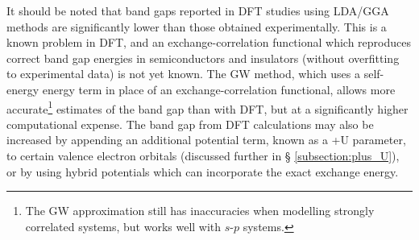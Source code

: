 It should be noted that band gaps reported in DFT studies using LDA/GGA methods are significantly lower than those obtained experimentally. This is a known problem in DFT, and an exchange-correlation functional which reproduces correct band gap energies in semiconductors and insulators (without overfitting to experimental data) is not yet known. The GW method, which uses a self-energy energy term in place of an exchange-correlation functional, allows more accurate\footnote{The GW approximation still has inaccuracies when modelling strongly correlated systems, but works well with $s$-$p$ systems.} estimates of the band gap than with DFT, but at a significantly higher computational expense. The band gap from DFT calculations may also be increased by appending an additional potential term, known as a +U parameter, to certain valence electron orbitals (discussed further in § \ref{subsection:plus_U}), or by using hybrid potentials which can incorporate the exact exchange energy.

